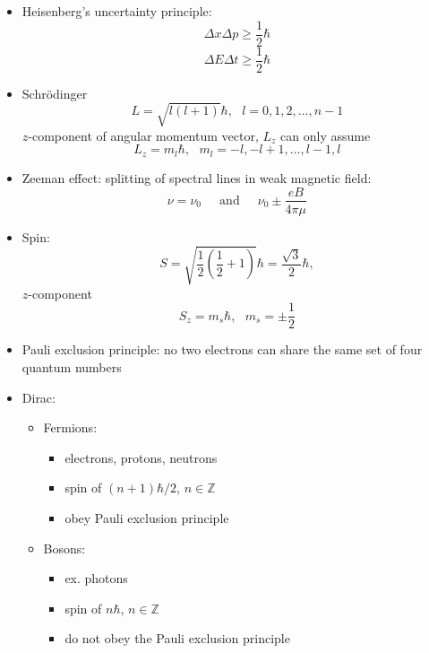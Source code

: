 \documentclass[12pt]{article}
\begin{document}
\begin{itemize}
\item Heisenberg's uncertainty principle:
\begin{equation}
\Delta x \Delta p \ge \frac{1}{2}\hbar
\end{equation}
\begin{equation}
\Delta E \Delta t \ge \frac{1}{2} \hbar
\end{equation}

\item Schr\"odinger
\begin{equation}
L = \sqrt{l(l+1)}\hbar,~~~l = 0, 1, 2, \dots, n-1
\end{equation}
$z$-component of angular momentum vector, $L_z$ can only assume
\begin{equation}
L_z = m_l \hbar,~~~m_l = -l,-l+1, \dots, l-1, l
\end{equation}
\item Zeeman effect: splitting of spectral lines in weak magnetic field:
\begin{equation}
\nu = \nu_0~~~~~\text{ and }~~~~~\nu_0\pm\frac{eB}{4\pi\mu}
\end{equation}
\item Spin:
\begin{equation}
S = \sqrt{\frac{1}{2}\left(\frac{1}{2}+1\right)}\hbar = \frac{\sqrt{3}}{2}\hbar,
\end{equation}
$z$-component
\begin{equation}
S_z = m_s\hbar,~~~m_s = \pm\frac{1}{2}
\end{equation}
\item Pauli exclusion principle: no two electrons can share the same set of four quantum numbers
\item Dirac:
\begin{itemize}
\item Fermions: 
\begin{itemize}
\item electrons, protons, neutrons
\item spin of $(n+1)\hbar/2$, $n\in\mathbb{Z}$
\item obey Pauli exclusion principle
\end{itemize}
\item Bosons:
\begin{itemize}
\item ex. photons
\item spin of $n\hbar$, $n\in\mathbb{Z}$
\item do not obey the Pauli exclusion principle
\end{itemize}

\end{itemize}
\end{itemize}
\end{document}
